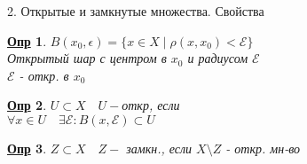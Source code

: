 \documentclass[12pt, fleqn]{article}
\newenvironment{question}[1]{\hspace*{-4em} #1}{\newpage}
\theoremstyle{nonumbermarginbreak}
\newtheorem{definition}{\hspace*{-2em}\underline{\bfseries Опр}}[section]
\begin{document}
    \begin{question}{2. Открытые и замкнутые множества. Свойства}
        \begin{definition} 
            $B(x_0, \epsilon) = \{x \in X \; | \; \rho(x, x_0) < \mathcal{E}\}$\\
            Открытый шар с центром в $x_0$ и радиусом $\mathcal{E}$\\
            $\mathcal{E}$ - откр. в $x_0$
        \end{definition}
        
        \begin{definition} 
            $U \subset X \quad U -$откр, если\\
            $\forall x \in U \quad \exists \mathcal{E}: B(x, \mathcal{E}) \subset U$
        \end{definition}

        \begin{definition} 
            $Z \subset X \quad Z -$ замкн., если $X \setminus Z$ - откр. мн-во
        \end{definition}


\end{question}
\end{document}
